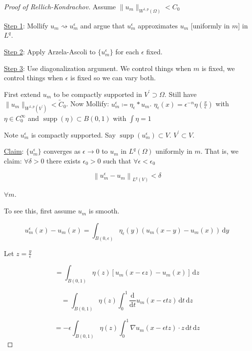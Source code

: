 \documentclass{article}
\theoremstyle{definition}
\begin{document}
\begin{proof}[Proof of Rellich-Kondrachov]

    Assume \(\lVert u_m \rVert _{W^{1,p}(\Omega)} < C_0\) 

    \underline{Step 1}: Mollify \(u_m \rightsquigarrow u_m ^ \epsilon\) and argue that \(u_m ^ \epsilon\) approximates \(u_m\) [uniformly in \(m\)] in \(L^q\).

    \underline{Step 2}: Apply Arzela-Ascoli to \(\{ u_m ^ \epsilon \} \) for each \(\epsilon\) fixed.

    \underline{Step 3}: Use diagonalization argument. We control things when \(m\) is fixed, we control things when \(\epsilon\) is fixed so we can vary both.
    
    First extend \(u_m\) to be compactly supported in \(V^{\prime} \supset \Omega\). Still have \(\lVert u_m \rVert _{ W^{1,p}(V^{\prime} )} < \tilde{C}_0\). Now Mollify: \(u_m ^\epsilon \coloneqq \eta _ \epsilon  \ast u_m\). \(\eta_{\epsilon}(x) = \epsilon ^ {-n} \eta \left( \frac{x}{\epsilon } \right)  \) with \(\eta \in C_0^{\infty} \) and \(\mathop{\mathrm{supp}}(\eta) \subset B(0,1)\) with \(\int \eta = 1\) 
    
    Note \(u_m ^ \epsilon\) is compactly supported. Say \(\mathop{\mathrm{supp}}(u_m ^ \epsilon) \subset V\). \(V^{\prime}  \subset V\).

    \underline{Claim}: \(\{ u_m ^ \epsilon \} \) converges as \(\epsilon  \to 0\) to \(u_m\) in \(L^q (\Omega)\) uniformly in \(m\). That is, we claim: \(\forall \delta > 0\) there exists \(\epsilon_0 > 0\) such that \(\forall \epsilon < \epsilon _ 0\)

    \[
        \left\lVert u_m ^ \epsilon - u_m     \right\rVert _ {L^q(V)} < \delta
    \]

    \(\forall m\).

    To see this, first assume \(u_m\) is smooth.

    \[
        u_m ^ \epsilon (x) - u_m (x) = \int_{B(0,\epsilon)}^{} \eta_{\epsilon}(y) \left( u_m(x-y) - u_m(x) \right)  \,\mathrm{d}y 
    \]

    Let \(z = \frac{y}{\epsilon }\) 

    \[
        = \int_{B(0,1)}^{} \eta (z) \left[ u_m(x-\epsilon z) - u_m(x) \right] \,\mathrm{d}z 
    \]

    \[
        = \int_{B(0,1)}^{} \eta (z) \int _ 0 ^ 1 \frac{\mathrm{d}}{\mathrm{d}t} u_m (x - \epsilon t z) \,\mathrm{d}t \, \mathrm{d}z
    \]

    \[
        = - \epsilon \int_{B(0,1)}^{} \eta (z) \int_{0}^{1} \nabla u_m(x - \epsilon t z) \cdot z \,\mathrm{d}t  \,\mathrm{d}z 
    \]


\end{proof}
\end{document}

